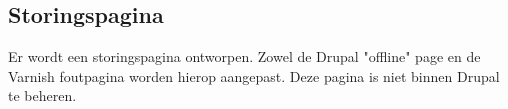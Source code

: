 \subsection{Storingspagina}\label{storingspagina}

Er wordt een storingspagina ontworpen. Zowel de Drupal "offline" page en de Varnish foutpagina worden hierop aangepast. Deze pagina is niet binnen Drupal te beheren.
